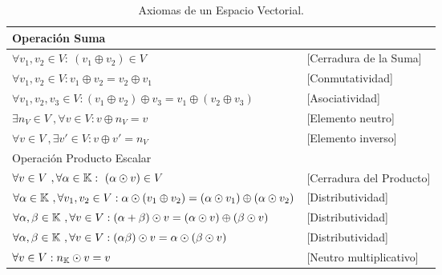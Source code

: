 \begin{table}[htbp]
    \begin{center}
        \begin{tabular}{|l|l|}
            \hline
            \multicolumn{2}{|l|}{Operación Suma} \\
            \hline \hline
            $\forall v_1,v_2 \in V:\ (v_1 \oplus v_2 )\in V$ &[Cerradura de la Suma] \\ \hline
            $\forall v_1,v_2\in V : v_1\oplus v_2=v_2\oplus v_1  $&[Conmutatividad]  \\ \hline
            $\forall v_1,v_2,v_3\in V:(v_1\oplus v_2 )\oplus v_3=v_1\oplus (v_2\oplus v_3 )$&[Asociatividad] \\ 
            \hline
            $\exists n_V\in V\ ,\forall v\in V  :  v\oplus n_V=v$&  [Elemento neutro]  \\ \hline
            $\forall v\in V\ ,\exists v'\in V: v\oplus v'=n_V$&  [Elemento inverso]  \\ \hline \hline
            \multicolumn{2}{|l|}{Operación Producto Escalar} \\
            \hline \hline
            $\forall v \in V \ , \forall \alpha \in \mathbb{K} :\ (\alpha \odot v )\in V$& [Cerradura del Producto] \\ \hline
            $ \forall \alpha \in \mathbb{K}\ , \forall v_1,v_2\in V: \alpha \odot (v_1\oplus v_2 )=(\alpha \odot v_1)\oplus (\alpha \odot v_2) $&  [Distributividad]  \\ \hline
            $\forall \alpha ,\beta \in \mathbb{K}\ , \forall v\in V : (\alpha +\beta )\odot v=(\alpha \odot v)\oplus(\beta \odot v)  $&  [Distributividad]  \\ \hline
            $\forall \alpha ,\beta \in \mathbb{K}\ , \forall  v\in V : (\alpha  \beta )\odot v=\alpha \odot (\beta \odot v) $&  [Distributividad]  \\ \hline
            $\forall  v\in V    :   n_{\mathbb{K}} \odot v=v $&  [Neutro multiplicativo]  \\ \hline
        \end{tabular}
        \caption{Axiomas de un Espacio Vectorial.}
        \label{Tabla: Sencilla}
    \end{center}
\end{table}

